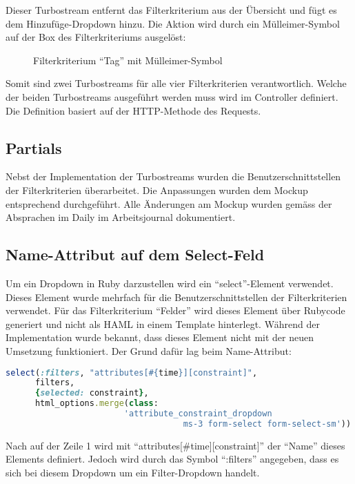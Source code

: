 Dieser Turbostream entfernt das Filterkriterium aus der Übersicht und fügt es dem Hinzufüge-Dropdown hinzu.
Die Aktion wird durch ein Mülleimer-Symbol auf der Box des Filterkriteriums ausgelöst:

\begin{figure}[h]
   \centering
   \caption{Filterkriterium ``Tag'' mit Mülleimer-Symbol}
\end{figure}

Somit sind zwei Turbostreams für alle vier Filterkriterien verantwortlich. Welche der beiden Turbostreams
ausgeführt werden muss wird im Controller definiert. Die Definition basiert auf der HTTP-Methode des Requests.

\subsection{Partials}
Nebst der Implementation der Turbostreams wurden die Benutzerschnittstellen der Filterkriterien überarbeitet. Die Anpassungen
wurden dem Mockup entsprechend durchgeführt. Alle Änderungen am Mockup wurden gemäss der Absprachen im Daily im Arbeitsjournal dokumentiert.

\newpage

\subsection{Name-Attribut auf dem Select-Feld}
Um ein Dropdown in Ruby darzustellen wird ein ``select''-Element verwendet. Dieses Element wurde mehrfach für die Benutzerschnittstellen der 
Filterkriterien verwendet. Für das Filterkriterium ``Felder'' wird dieses Element über Rubycode generiert und nicht als HAML in einem 
Template hinterlegt. Während der Implementation wurde bekannt, dass dieses Element nicht mit der neuen Umsetzung funktioniert.
Der Grund dafür lag beim Name-Attribut:
\newline

\begin{lstlisting}[language=Ruby]
   select(:filters, "attributes[#{time}][constraint]",
      filters,
      {selected: constraint},
      html_options.merge(class:
                        'attribute_constraint_dropdown
                                    ms-3 form-select form-select-sm'))   
\end{lstlisting}

Nach auf der Zeile 1 wird mit ``attributes[\#{time}][constraint]'' der ``Name'' dieses Elements definiert.
Jedoch wird durch das Symbol ``:filters'' angegeben, dass es sich bei diesem Dropdown um ein Filter-Dropdown handelt.

